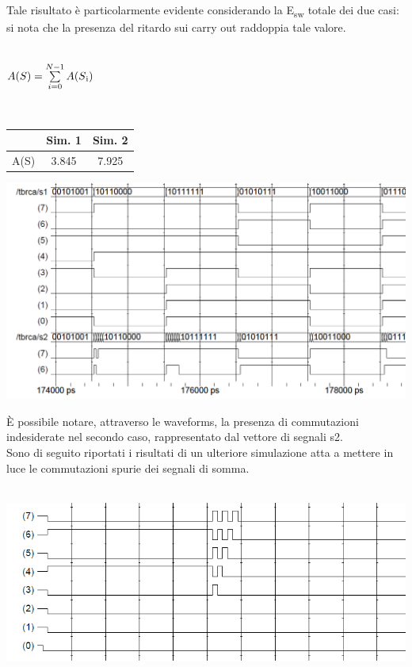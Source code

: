 \documentclass[11pt,  english, makeidx, a4paper, titlepage, oneside]{book}
\begin{document}
\\\\
Tale risultato è particolarmente evidente considerando la E\textsubscript{sw} totale dei due casi: si nota che la presenza del ritardo sui carry out raddoppia tale valore.\\\\
\centerline{$A(S) = \sum\limits_{i=0}^{N-1} A(S\textsubscript{i})$}\\
\vspace{0.2cm}
\begin{center}
\begin{tabular}{|c|c|c|}
\hline
 & Sim. 1 & Sim. 2 \\
\hline
A(S) & 3.845 & 7.925\\
\hline
\end{tabular}
\end{center}
\vspace{0.3cm}
\centerline{\includegraphics[width=15cm]{./img/Lab_1/Es_2/Glitch.png}}
\vspace{0.3cm}
È possibile notare, attraverso le waveforms, la presenza di commutazioni indesiderate nel secondo caso, rappresentato dal vettore di segnali s2.
\\
Sono di seguito riportati i risultati di un ulteriore simulazione atta a mettere in luce le commutazioni spurie dei segnali di somma.
\\\\
 \centerline{\includegraphics[width=15cm]{./img/Lab_1/Es_2/Glitch_worst_case.png}}
\end{document}
